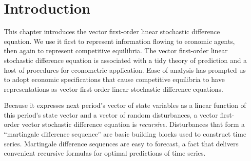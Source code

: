 %
%


\section
{Introduction}

This chapter introduces the vector  first-order  linear stochastic
difference equation.   %
  We  use it first to represent  information flowing to
economic agents, then again to represent competitive  equilibria.
The vector first-order linear stochastic difference equation is associated with a tidy
theory of prediction and a host of procedures for econometric application.
Ease of analysis has prompted us to adopt economic specifications
that cause competitive equilibria to have representations as vector first-order
linear stochastic difference equations.
%



Because it expresses next period's vector of state variables as a linear
function of this period's state vector and a vector of random disturbances, a vector first-order vector stochastic difference equation is {\it recursive\/}.  Disturbances that form a ``martingale difference sequence''  are  basic building blocks used to construct time series.
Martingale difference sequences are easy to forecast, a fact that
delivers convenient recursive formulas for optimal predictions of time series.

